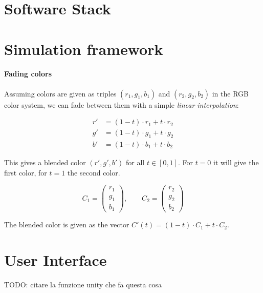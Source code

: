 \section{Software Stack}
\section{Simulation framework}

\paragraph{Fading colors}

Assuming colors are given as triples $(r_1,g_1,b_1)$ and $(r_2,g_2,b_2)$ in the RGB color system, we can fade between them with a simple \textit{linear interpolation}:

\begin{align}
r' &= (1-t)\cdot r_1+t\cdot r_2\\
g' &= (1-t)\cdot g_1+t\cdot g_2\\
b' &= (1-t)\cdot b_1+t\cdot b_2
\end{align}

This gives a blended color $(r',g',b')$ for all $t\in[0,1]$. For $t=0$ it will give the first color, for $t=1$ the second color.



$$ C_1=\begin{pmatrix}r_1\\g_1\\b_1\end{pmatrix}, \qquad C_2=\begin{pmatrix}r_2\\g_2\\b_2\end{pmatrix}$$

The blended color is given as the vector $C'(t)=(1-t)\cdot C_1+t\cdot C_2$.
\section{User Interface}

TODO: citare la funzione unity che fa questa cosa